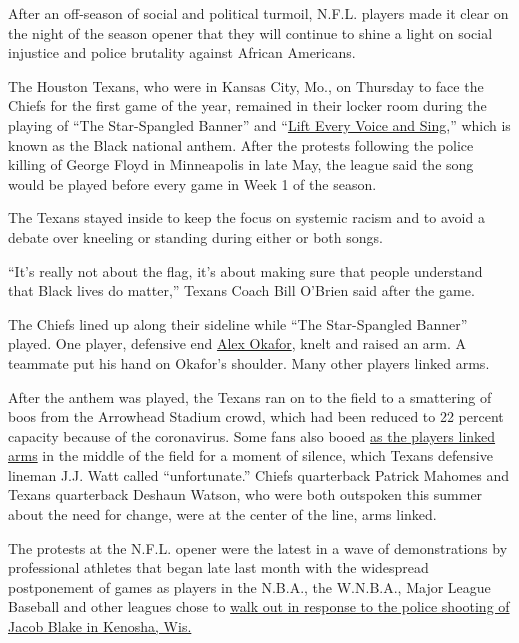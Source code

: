 After an off-season of social and political turmoil, N.F.L. players made
it clear on the night of the season opener that they will continue to
shine a light on social injustice and police brutality against African
Americans.

The Houston Texans, who were in Kansas City, Mo., on Thursday to face
the Chiefs for the first game of the year, remained in their locker room
during the playing of ``The Star-Spangled Banner'' and
``\href{https://twitter.com/NFL/status/1304212564599955456?s=20}{Lift
Every Voice and Sing},'' which is known as the Black national anthem.
After the protests following the police killing of George Floyd in
Minneapolis in late May, the league said the song would be played before
every game in Week 1 of the season.

The Texans stayed inside to keep the focus on systemic racism and to
avoid a debate over kneeling or standing during either or both songs.

``It's really not about the flag, it's about making sure that people
understand that Black lives do matter,'' Texans Coach Bill O'Brien said
after the game.

The Chiefs lined up along their sideline while ``The Star-Spangled
Banner'' played. One player, defensive end
\href{https://www.chiefs.com/team/players-roster/alex-okafor/}{Alex
Okafor}, knelt and raised an arm. A teammate put his hand on Okafor's
shoulder. Many other players linked arms.

After the anthem was played, the Texans ran on to the field to a
smattering of boos from the Arrowhead Stadium crowd, which had been
reduced to 22 percent capacity because of the coronavirus. Some fans
also booed
\href{https://twitter.com/ComplexSports/status/1304216261904281600}{as
the players linked arms} in the middle of the field for a moment of
silence, which Texans defensive lineman J.J. Watt called
``unfortunate.'' Chiefs quarterback Patrick Mahomes and Texans
quarterback Deshaun Watson, who were both outspoken this summer about
the need for change, were at the center of the line, arms linked.

The protests at the N.F.L. opener were the latest in a wave of
demonstrations by professional athletes that began late last month with
the widespread postponement of games as players in the N.B.A., the
W.N.B.A., Major League Baseball and other leagues chose to
\href{https://www.nytimes3xbfgragh.onion/2020/08/26/sports/basketball/nba-boycott-bucks-magic-blake-shooting.html}{walk
out in response to the police shooting of Jacob Blake in Kenosha, Wis.}


